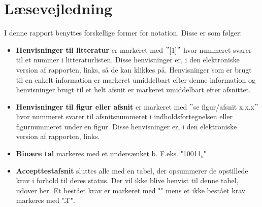 \section*{Læsevejledning}
I denne rapport benyttes forskellige former for notation. Disse er som følger:

\begin{itemize}
\item \textbf{Henvisninger til litteratur} er markeret med $"$[1]$"$ hvor nummeret svarer til et nummer i litteraturlisten. Disse henvisninger er, i den elektroniske version af rapporten, links, så de kan klikkes på. Henvisninger som er brugt til en enkelt information er markeret umiddelbart efter denne information og henvisninger brugt til et helt afsnit er markeret umiddelbart efter afsnittet.

\item \textbf{Henvisninger til figur eller afsnit} er markeret med $"$se figur/afsnit x.x.x$"$ hvor nummeret svarer til afsnitsnummeret i indholdsfortegnelsen eller figurnummeret under en figur. Disse henvisninger er, i den elektroniske version af rapporten, links.

\item \textbf{Binære tal} markeres med et undersænket b. F.eks. "10011$_b$" 

\item \textbf{Accepttestafsnit} sluttes alle med en tabel, der opsummerer de opstillede krav i forhold til deres status. Der vil ikke blive henvist til denne tabel, udover her. Et bestået krav er markeret med "\checkmark" mens et ikke bestået krav markeres med "$\mathcal{X}$".
\end{itemize}
